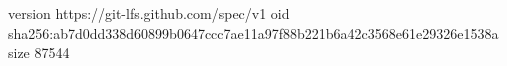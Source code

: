 version https://git-lfs.github.com/spec/v1
oid sha256:ab7d0dd338d60899b0647ccc7ae11a97f88b221b6a42c3568e61e29326e1538a
size 87544
